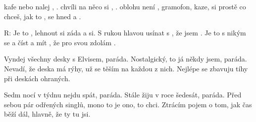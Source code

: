 
  \zs

 kafe nebo nalej , . 
 chvíli na něco si , . 
 oblohu  není ,  gramofon,  kaze, 
 si prostě  co chceš,  jak to , 
 se hned a . 

\ks
\zr

R: Je to , lehnout si  záda a  si. 
S rukou  hlavou usínat s , že jsem .  
Je to  s nikým se  a číst  
a mít , že pro svou  zdolám . 

\kr
\zs

Vyndej všechny desky s Elvisem, paráda. 
Nostalgický, to já někdy jsem, paráda. 
Nevadí, že deska má rýhy, už se těším na každou z nich. 
Nejlépe se zbavuju tíhy 
při deskách ohraných. 

\ks
\zr    \kr
\zs

Sedm nocí v týdnu nejdu spát, paráda. 
Stále žiju v roce šedesát, paráda. 
Před sebou pár odřených singlů, mono to je ono, to chci. 
Ztrácím pojem o tom, jak čas běží dál, 
hlavně, že ty tu jsi. 

\ks
\zr \kr

\kp
